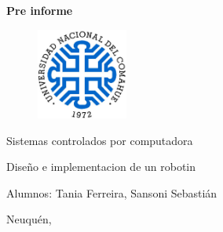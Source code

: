 \documentclass[10pt,conference,a4paper,onecolumn]{article}%
\begin{document}



\begin{titlepage}
\centering
\begin{Huge}
 
\textbf{Pre informe}  \\

\end{Huge}


\vspace{2cm}
\begin{figure}[h]
\centering
\includegraphics[width=3cm]{./imagenes/LogoUNC}
\end{figure}

\vspace{2cm}
\normalsize
\begin{LARGE}


 Sistemas controlados por computadora \\


 
 \end{LARGE}
 \vspace{2cm}
\begin{Large}
Diseño e implementacion de un robotin
\end{Large}
\vspace{2cm}
\normalsize 
\begin{flushleft}
Alumnos: Tania Ferreira,  Sansoni Sebastián 

\end{flushleft}

\vspace{1cm}


\centering Neuquén, \the\year \\


\vspace{1cm}



\end{titlepage}
\end{document}
